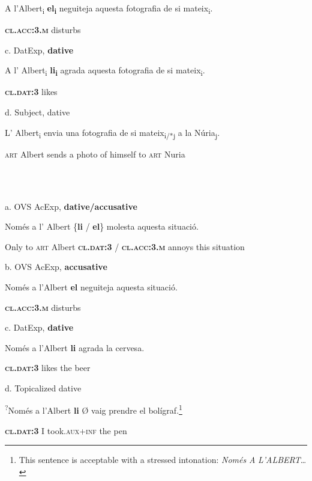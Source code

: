\documentclass[output=paper,modfonts,nonflat]{langsci/langscibook}
\begin{document}
          A l’Albert\textsubscript{i} \textbf{el\textsubscript{i}}                 neguiteja aquesta fotografia de si mateix\textsubscript{i}.

                            \textbf{\textsc{cl.acc:3.m}} disturbs

      c. DatExp, \textbf{dative}

          A l’     Albert\textsubscript{i} \textbf{li\textsubscript{i}}              agrada aquesta fotografia de si mateix\textsubscript{i}.

                                 \textbf{\textsc{cl.dat:3}} likes

      d. Subject, dative

          L’   Albert\textsubscript{i} envia una fotografia de si mateix\textsubscript{i/*j} a  la     Núria\textsubscript{j}.

          \textsc{art} Albert sends a     photo        of himself       to \textsc{art} Nuria

\ea%
    \label{ex:key:9}
    \gll\\
        \\
    \glt
    \z

         a. OVS AcExp, \textbf{dative/accusative}

          Només a  l’     Albert \{\textbf{li}              / \textbf{el}\}               molesta aquesta situació. 

          Only    to \textsc{art} Albert  \textbf{\textsc{cl.dat:3}} / \textbf{\textsc{cl.acc:3.m}} annoys  this       situation

      b. OVS AcExp, \textbf{accusative}

          Només a  l’Albert \textbf{el}                  neguiteja aquesta situació.

                                       \textbf{\textsc{cl.acc:3.m}} disturbs

      c. DatExp, \textbf{dative}

          Només a l’Albert \textbf{li}              agrada la   cervesa.

                                      \textbf{\textsc{cl.dat:3}} likes     the beer

      d. Topicalized dative

          \textsuperscript{?}Només a l’Albert \textbf{li}              Ø vaig  prendre  el   bolígraf.\footnote{This sentence is acceptable with a stressed intonation: \textit{Només} \textit{A} \textit{L’ALBERT}…}

                                       \textbf{\textsc{cl.dat:3}}  I  took.\textsc{aux+inf} the pen
\end{document}
